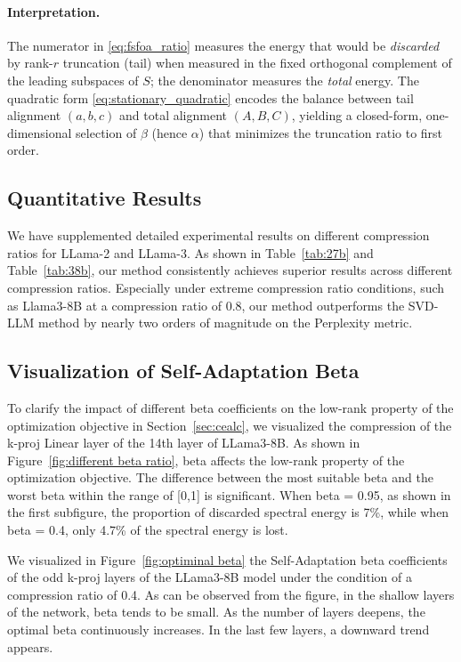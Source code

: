 \paragraph{Interpretation.}
The numerator in \eqref{eq:fsfoa_ratio} measures the energy that would be \emph{discarded} by rank-$r$ truncation (tail) when measured in the fixed orthogonal complement of the leading subspaces of $S$; the denominator measures the \emph{total} energy. The quadratic form \eqref{eq:stationary_quadratic} encodes the balance between tail alignment $(a,b,c)$ and total alignment $(A,B,C)$, yielding a closed-form, one-dimensional selection of $\beta$ (hence $\alpha$) that minimizes the truncation ratio to first order.



\newpage
\subsection{Quantitative Results}


We have supplemented detailed experimental results on different compression ratios for LLama-2 and LLama-3. As shown in Table~\ref{tab:27b} and Table~\ref{tab:38b}, our method consistently achieves superior results across different compression ratios. Especially under extreme compression ratio conditions, such as Llama3-8B at a compression ratio of 0.8, our method outperforms the SVD-LLM method by nearly two orders of magnitude on the Perplexity metric.


\newpage
\subsection{Visualization of Self-Adaptation Beta}
To clarify the impact of different beta coefficients on the low-rank property of the optimization objective in Section~\ref{sec:cealc}, we visualized the compression of the k-proj Linear layer of the 14th layer of LLama3-8B. As shown in Figure~\ref{fig:different beta ratio}, beta affects the low-rank property of the optimization objective. The difference between the most suitable beta and the worst beta within the range of [0,1] is significant. When beta = 0.95, as shown in the first subfigure, the proportion  of discarded spectral energy is 7\%, while when beta = 0.4, only 4.7\% of the spectral energy is lost.


We visualized in Figure~\ref{fig:optiminal beta} the Self-Adaptation beta coefficients of the odd k-proj layers of the LLama3-8B model under the condition of a compression ratio of 0.4. As can be observed from the figure, in the shallow layers of the network, beta tends to be small. As the number of layers deepens, the optimal beta continuously increases. In the last few layers, a downward trend appears.


